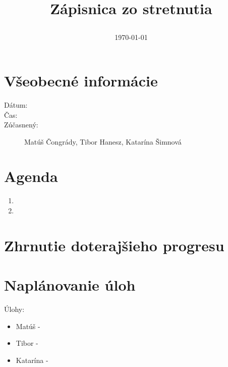 \documentclass[11pt]{article}
\begin{document}
	\title{Zápisnica zo stretnutia
		\author{
			\date{\today}
		}}
		\maketitle
		
		\section{Všeobecné informácie}
		\begin{description}
			\item[Dátum:] 
			\item[Čas:] 
			\item[Zúčasnený:] Matúš Čongrády, Tibor Hanesz, Katarína Šimnová
		\end{description}
		
		\section{Agenda}
		\begin{enumerate}
			\item 
			\item 
		
		\end{enumerate}
		
		\section{Zhrnutie doterajšieho progresu}
			\par 
	
		
		\section{Naplánovanie úloh}
			\par 
			
			\par Úlohy:
			\begin{itemize}
			\item Matúš - 
			\item Tibor - 
			\item Katarína - 
			\end{itemize}
		
	
\end{document}
